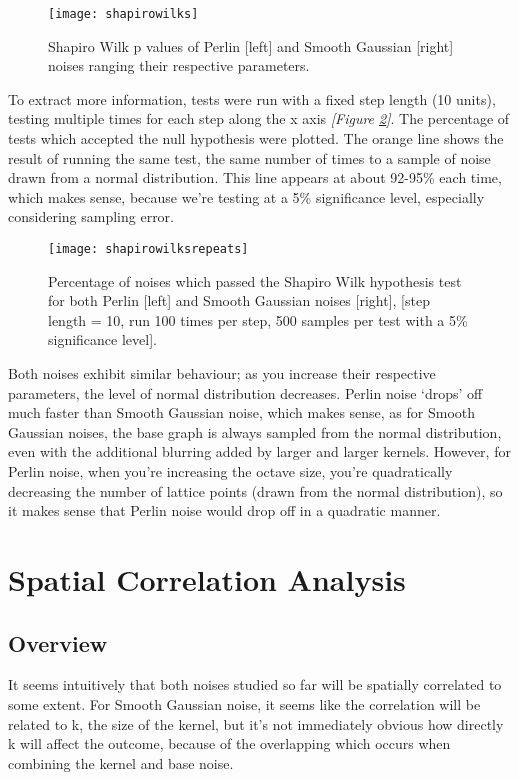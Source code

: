 \documentclass[11pt,a4paper]{article}
\begin{document}
\begin{figure}[h]
	\centering
	\texttt{[image: shapirowilks]}
	\caption{Shapiro Wilk p values of Perlin [left] and Smooth Gaussian [right] noises ranging their respective parameters.}
	\label{fig:shapirowilks}
\end{figure}


To extract more information, tests were run with a fixed step length (10 units), testing multiple times for each step along the x axis \emph{[Figure \ref{fig:shapirowilksrepeats}]}. The percentage of tests which accepted the null hypothesis were plotted. The orange line shows the result of running the same test, the same number of times to a sample of noise drawn from a normal distribution. This line appears at about 92-95\% each time, which makes sense, because we’re testing at a 5\% significance level, especially considering sampling error. 

\begin{figure}[h]
	\centering
	\texttt{[image: shapirowilksrepeats]}
	\caption{Percentage of noises which passed the Shapiro Wilk hypothesis test for both Perlin [left] and Smooth Gaussian noises [right], [step length = 10, run 100 times per step, 500 samples per test with a 5\% significance level].}
	\label{fig:shapirowilksrepeats}
\end{figure}

Both noises exhibit similar behaviour; as you increase their respective parameters, the level of normal distribution decreases. Perlin noise ‘drops’ off much faster than Smooth Gaussian noise, which makes sense, as for Smooth Gaussian noises, the base graph is always sampled from the normal distribution, even with the additional blurring added by larger and larger kernels. However, for Perlin noise, when you’re increasing the octave size, you’re quadratically decreasing the number of lattice points (drawn from the normal distribution), so it makes sense that Perlin noise would drop off in a quadratic manner. 

\section{Spatial Correlation Analysis}

\subsection{Overview}

It seems intuitively that both noises studied so far will be spatially correlated to some extent. For Smooth Gaussian noise, it seems like the correlation will be related to k, the size of the kernel, but it’s not immediately obvious how directly k will affect the outcome, because of the overlapping which occurs when combining the kernel and base noise.
\end{document}
